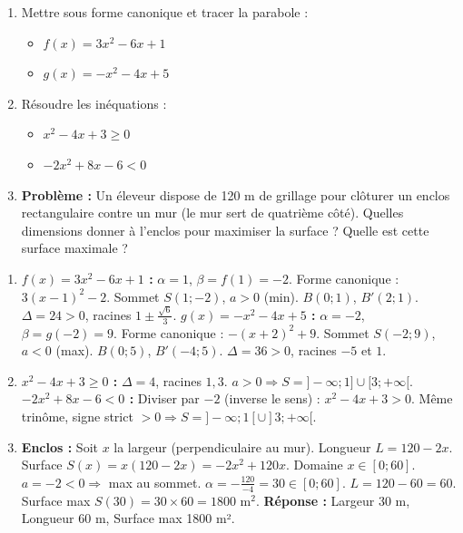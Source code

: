 \documentclass[11pt]{article}
\begin{document}
\begin{exercice}[Entraînement]
\begin{enumerate}
  \item Mettre sous forme canonique et tracer la parabole :
  \begin{itemize}
    \item $f(x) = 3x^2 - 6x + 1$
    \item $g(x) = -x^2 - 4x + 5$
  \end{itemize}
  \item Résoudre les inéquations :
  \begin{itemize}
    \item $x^2 - 4x + 3 \ge 0$
    \item $-2x^2 + 8x - 6 < 0$
  \end{itemize}
  \item \textbf{Problème :} Un éleveur dispose de 120 m de grillage pour clôturer un enclos rectangulaire contre un mur (le mur sert de quatrième côté). Quelles dimensions donner à l'enclos pour maximiser la surface ? Quelle est cette surface maximale ?
\end{enumerate}
\end{exercice}

\begin{corrige}[Exercice n]
\begin{enumerate}
  \item \textbf{$f(x)=3x^2-6x+1$ :} $\alpha = 1$, $\beta = f(1) = -2$. Forme canonique : $3(x-1)^2-2$. Sommet $S(1;-2)$, $a>0$ (min). $B(0;1)$, $B'(2;1)$. $\Delta=24>0$, racines $1\pm\frac{\sqrt{6}}{3}$.
  \textbf{$g(x)=-x^2-4x+5$ :} $\alpha = -2$, $\beta = g(-2) = 9$. Forme canonique : $-(x+2)^2+9$. Sommet $S(-2;9)$, $a<0$ (max). $B(0;5)$, $B'(-4;5)$. $\Delta=36>0$, racines $-5$ et $1$.
  \item \textbf{$x^2-4x+3\ge0$ :} $\Delta=4$, racines $1, 3$. $a>0 \Rightarrow S = ]-\infty;1] \cup [3;+\infty[$.
  \textbf{$-2x^2+8x-6<0$ :} Diviser par $-2$ (inverse le sens) : $x^2-4x+3>0$. Même trinôme, signe strict $>0 \Rightarrow S = ]-\infty;1[ \cup ]3;+\infty[$.
  \item \textbf{Enclos :} Soit $x$ la largeur (perpendiculaire au mur). Longueur $L = 120 - 2x$. Surface $S(x) = x(120-2x) = -2x^2 + 120x$. Domaine $x \in [0;60]$.
  $a=-2<0 \Rightarrow$ max au sommet. $\alpha = -\frac{120}{-4} = 30 \in [0;60]$.
  $L = 120 - 60 = 60$. Surface max $S(30) = 30 \times 60 = 1800 \text{ m}^2$.
  \textbf{Réponse :} Largeur 30 m, Longueur 60 m, Surface max 1800 m².
\end{enumerate}
\end{corrige}
\end{document}
